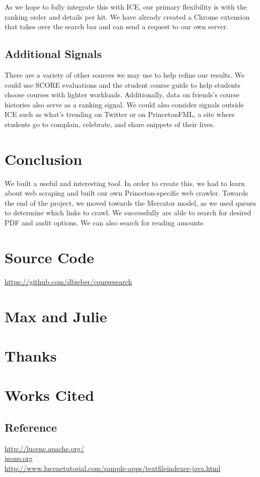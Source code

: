 \documentclass[12pt,letterpaper]{article}
\begin{document}
As we hope to fully integrate this with ICE, our primary flexibility is with the ranking order and details per hit. We have already created a Chrome extension that takes over the search bar and can send a request to our own server.  

\subsection{Additional Signals}

There are a variety of other sources we may use to help refine our results. We could use SCORE evaluations and the student course guide to help students choose courses with lighter workloads. Additionally, data on friends's course histories also serve as a ranking signal. We could also consider signals outside ICE such as what's trending on Twitter or on PrincetonFML, a site where students go to complain, celebrate, and share snippets of their lives. 

\section{Conclusion}

We built a useful and interesting tool. In order to create this, we had to learn about web scraping and built our own Princeton-specific web crawler. Towards the end of the project, we moved towards the Mercator model, as we used queues to determine which links to crawl.    We successfully are able to search for desired PDF and audit options. We can also search for reading amounts 

\appendix

\section{Source Code}
\url{https://github.com/dbieber/coursesearch}
\section{Max and Julie}
\section{Thanks}
\section{Works Cited}
\subsection{Reference}
\url{http://lucene.apache.org/} \\
\url{jsoup.org} \\
\url{http://www.lucenetutorial.com/sample-apps/textfileindexer-java.html} \\
\end{document}
